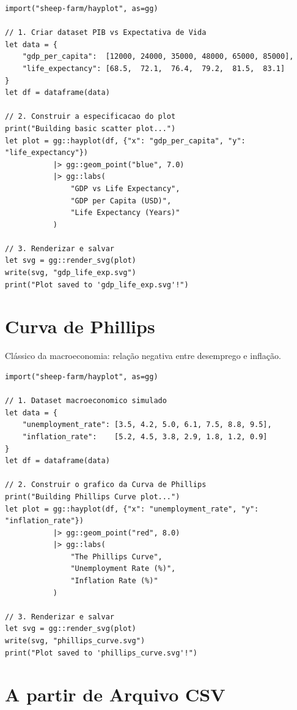\documentclass[12pt, a4paper, oneside]{book}
\begin{document}
\begin{lstlisting}[caption={examples/basic\_scatter.hay}]
import("sheep-farm/hayplot", as=gg)

// 1. Criar dataset PIB vs Expectativa de Vida
let data = {
    "gdp_per_capita":  [12000, 24000, 35000, 48000, 65000, 85000],
    "life_expectancy": [68.5,  72.1,  76.4,  79.2,  81.5,  83.1]
}
let df = dataframe(data)

// 2. Construir a especificacao do plot
print("Building basic scatter plot...")
let plot = gg::hayplot(df, {"x": "gdp_per_capita", "y": "life_expectancy"})
           |> gg::geom_point("blue", 7.0)
           |> gg::labs(
               "GDP vs Life Expectancy",
               "GDP per Capita (USD)",
               "Life Expectancy (Years)"
           )

// 3. Renderizar e salvar
let svg = gg::render_svg(plot)
write(svg, "gdp_life_exp.svg")
print("Plot saved to 'gdp_life_exp.svg'!")
\end{lstlisting}

\section{Curva de Phillips}

Clássico da macroeconomia: relação negativa entre desemprego e inflação.

\begin{lstlisting}[caption={examples/phillips\_curve.hay}]
import("sheep-farm/hayplot", as=gg)

// 1. Dataset macroeconomico simulado
let data = {
    "unemployment_rate": [3.5, 4.2, 5.0, 6.1, 7.5, 8.8, 9.5],
    "inflation_rate":    [5.2, 4.5, 3.8, 2.9, 1.8, 1.2, 0.9]
}
let df = dataframe(data)

// 2. Construir o grafico da Curva de Phillips
print("Building Phillips Curve plot...")
let plot = gg::hayplot(df, {"x": "unemployment_rate", "y": "inflation_rate"})
           |> gg::geom_point("red", 8.0)
           |> gg::labs(
               "The Phillips Curve",
               "Unemployment Rate (%)",
               "Inflation Rate (%)"
           )

// 3. Renderizar e salvar
let svg = gg::render_svg(plot)
write(svg, "phillips_curve.svg")
print("Plot saved to 'phillips_curve.svg'!")
\end{lstlisting}

\section{A partir de Arquivo CSV}
\end{document}
